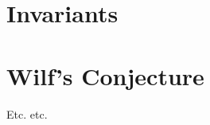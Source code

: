 \section{Invariants}\label{sec:smgps:theme1}

\begin{definition}[Multiplicity]
    
\end{definition}



\begin{definition}
\end{definition}

\begin{definition}
\end{definition}

\begin{definition}

\end{definition}


\begin{definition}[Genus]

\end{definition}

\section{Wilf's Conjecture}\label{sec:smgps:theme2}

Etc. etc.
